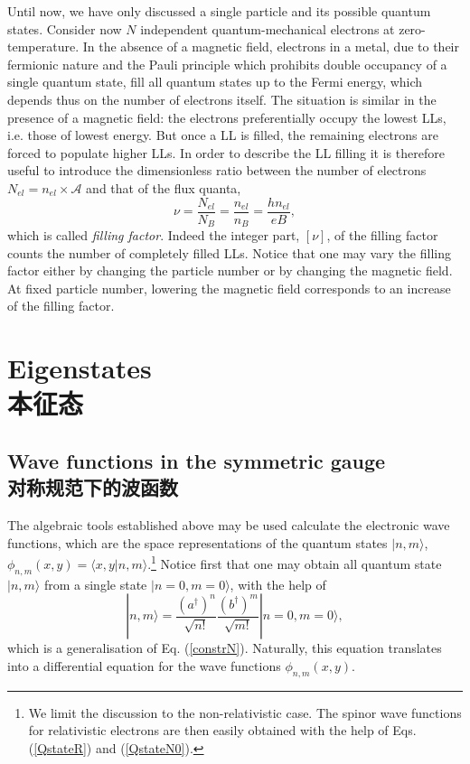 \documentclass[10pt]{book}
\newcommand{\Amath}{\mathcal{A}}
\newcommand{\beq}{\begin{equation}}
\newcommand{\eeq}{\end{equation}}
\begin{document}
Until now, we have only discussed a single particle and its possible quantum states. Consider now $N$ 
independent quantum-mechanical electrons at zero-temperature. In
the absence of a magnetic field, electrons in a metal, due to their fermionic nature and the Pauli principle which prohibits double
occupancy of a single quantum state, fill all quantum states up to the Fermi energy, which depends thus on the number of electrons
itself. The situation is similar in the presence of a magnetic field: the electrons preferentially occupy the lowest LLs, i.e. those
of lowest energy. But once a LL is filled, the remaining electrons are forced to populate higher LLs. In order to describe the
LL filling it is therefore useful to introduce the dimensionless ratio between the number of electrons $N_{el}=n_{el}\times \Amath$ 
and that of the flux quanta,
\beq\label{filling}
\nu = \frac{N_{el}}{N_B}=\frac{n_{el}}{n_B} = \frac{hn_{el}}{eB},
\eeq
which is called {\sl filling factor}. Indeed the integer part, $[\nu]$, of the filling factor counts the number of completely
filled LLs. Notice that one may vary the filling factor either by changing the particle number or by changing the magnetic field. 
At fixed particle number, lowering the magnetic field corresponds to an increase of the filling factor.



\section[本征态]{Eigenstates\\\bf 本征态}




\subsection[对称规范下的波函数]{Wave functions in the symmetric gauge\\\bf 对称规范下的波函数}
\label{WFsym}

The algebraic tools established above may be used calculate the electronic wave functions, which
are the space representations of the quantum states $|n,m\rangle$, $\phi_{n,m}(x,y)=\langle x,y|n,m\rangle$.\footnote{
We limit the discussion to the non-relativistic case. The spinor wave functions for relativistic electrons are then easily
obtained with the help of Eqs. (\ref{QstateR}) and (\ref{QstateN0}).}
Notice first that one may obtain all quantum state $|n,m\rangle$ from a single state $|n=0,m=0\rangle$, with the help
of 
\beq\label{constrNM}
|n,m\rangle = \frac{\left(a^{\dagger}\right)^n}{\sqrt{n!}} \frac{\left(b^{\dagger}\right)^m}{\sqrt{m!}}|n=0,m=0\rangle,
\eeq
which is a generalisation of Eq. (\ref{constrN}). Naturally, this equation translates into a differential equation for the
wave functions $\phi_{n,m}(x,y)$.
\end{document}
